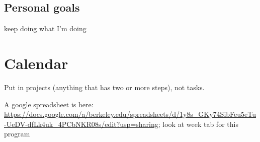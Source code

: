 \documentclass[12pt,twoside]{article}
\begin{document}
\subsection{Personal goals}
\begin{compactitem}
\item keep doing what I'm doing
\end{compactitem}



\section{Calendar}
Put in projects (anything that has two or more steps), not tasks.

A google spreadsheet is here: \url{https://docs.google.com/a/berkeley.edu/spreadsheets/d/1y8s_GKy74SibFeu5eTu-UeDV-dfLk4uk_4PCbNKR08s/edit?usp=sharing}; look at week tab for this program
\end{document}
